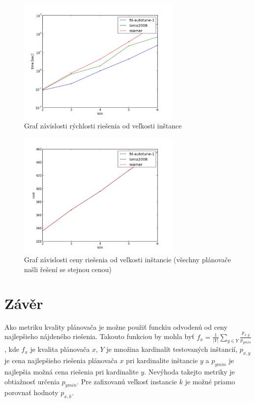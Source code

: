 \documentclass[a4paper,journal]{IEEEtran}
\begin{document}
\begin{figure}[h]%
  \centering
  \includegraphics[width=80mm]{speed}
  \caption{Graf z\'avislosti r\'ychlosti rie\v senia od ve\v lkosti in\v stance}
  \label{fig:speed}
\end{figure}
\begin{figure}[h]%
  \centering
  \includegraphics[width=80mm]{qual}
  \caption{Graf z\'avislosti ceny rie\v senia od ve\v lkosti in\v stancie (v\v sechny pl\'anova\v ce na\v sli \v re\v sen\'i se stejnou cenou)}
  \label{fig:qual}
\end{figure}
%
\section{Z\'av\v er}
 Ako metriku kvality pl\'anova\v ca je mo\v zne pou\v zi\v t funckiu odvoden\'u od ceny najlep\v sieho n\'ajden\'eho rie\v senia. Takouto funkciou by mohla by\v t
 $f_x = \frac{1}{\left|{Y}\right|}\sum_{y \in Y} \frac{p_{x,y}}{p_{ymin}}$, kde $f_x$ je kvalita pl\'anova\v ca $x$, $Y$ je mno\v zina kardinal\'it testovan\'ych in\v stanci\'i, 
 $p_{x,y}$ je cena najlep\v sieho rie\v senia pl\'anova\v ca $x$ pri kardinalite in\v stancie $y$ a $p_{ymin}$ je najlep\v sia mo\v zn\'a cena rie\v senia
 pri kardinalite $y$. Nev\'yhoda takejto metriky je obtia\v znos\v t ur\v cenia  $p_{ymin}$. Pre zafixovan\'u ve\v lkos\v t instancie $k$ je mo\v zn\'e priamo porovna\v t
 hodnoty $p_{x,k}$.
 
\end{document}
